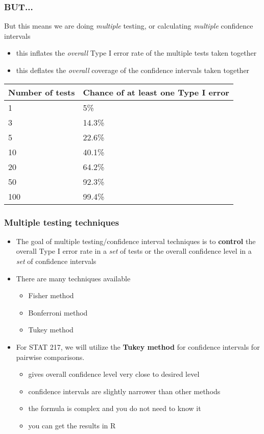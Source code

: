 \begin{frame}
\frametitle{BUT...}
But this means we are doing \emph{multiple} testing, or calculating \emph{multiple} confidence intervals
\begin{itemize}
    \item
    this inflates the \emph{overall} Type I error rate of the multiple tests taken together
    \item
    this deflates the \emph{overall} coverage of the confidence intervals taken together
\end{itemize}
\begin{tabular}{p{3cm} p{7cm}}
    \hline
    Number of tests & Chance of at least one Type I error \\
    \hline
    1   &  5\% \\
    3   & 14.3\% \\
    5   & 22.6\% \\
    10   & 40.1\% \\
    20   & 64.2\% \\
    50   & 92.3\%\\
    100   & 99.4\% \\
\end{tabular}
\end{frame}


\begin{frame}
\frametitle{Multiple testing techniques}
\begin{itemize}
    \item
    The goal of multiple testing/confidence interval techniques is to \textbf{control} the overall Type I error rate in a \emph{set} of tests or the overall confidence level in a \emph{set} of confidence intervals
    \item
    There are many techniques available
    \begin{itemize}
        \item
        Fisher method
        \item
        Bonferroni method
        \item
        Tukey method
    \end{itemize}
    \item
    For STAT 217, we will utilize the \textbf{Tukey method} for confidence intervals for pairwise comparisons.
    \begin{itemize}
        \item
        gives overall confidence level very close to desired level
        \item
        confidence intervals are slightly narrower than other methods
        \item
        the formula is complex and you do not need to know it
        \item
        you can get the results in R
    \end{itemize}
\end{itemize}
\end{frame}


